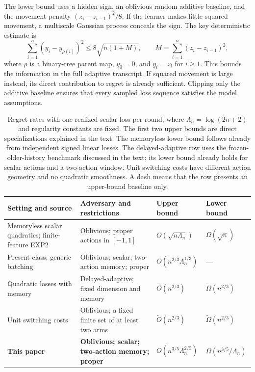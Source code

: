 \documentclass[11pt]{article}
\theoremstyle{definition}
\begin{document}
The lower bound uses a hidden sign, an oblivious random additive baseline, and the movement penalty $(z_i-z_{i-1})^2/8$. If the learner makes little squared movement, a multiscale Gaussian process conceals the sign. The key deterministic estimate is
\begin{equation}\label{eq:intro-tree}
 \sum_{i=1}^n(y_i-y_{\rho(i)})^2
 \leq 8\sqrt{n(1+M)},
 \qquad M=\sum_{i=1}^n(z_i-z_{i-1})^2,
\end{equation}
where $\rho$ is a binary-tree parent map, $y_0=0$, and $y_i=z_i$ for $i\geq1$. This bounds the information in the full adaptive transcript. If squared movement is large instead, its direct contribution to regret is already sufficient. Clipping only the additive baseline ensures that every sampled loss sequence satisfies the model assumptions.

\begin{table}[t]
\centering
\small
\setlength{\tabcolsep}{4pt}
\renewcommand{\arraystretch}{1.28}
\begin{tabularx}{\textwidth}{@{}>{\raggedright\arraybackslash}p{}>{\raggedright\arraybackslash}X>{\centering\arraybackslash}p{}>{\centering\arraybackslash}p{}@{}}
\toprule
\textbf{Setting and source} & \textbf{Adversary and restrictions} & \textbf{Upper bound} & \textbf{Lower bound}\\
\midrule
Memoryless scalar quadratics; finite-feature EXP2~\cite{bubeck}
& Oblivious; proper actions in $[-1,1]$
& $O(\sqrt{n\Lambda_n})$ & $\Omega(\sqrt n)$\\
Present class; generic batching~\cite{arora,bubeck}
& Oblivious; scalar; two-action memory; proper
& $O(n^{2/3}\Lambda_n^{1/3})$ & ---\\
Quadratic losses with memory~\cite{suggala}
& Delayed-adaptive; fixed dimension and memory
& $\widetilde O(n^{2/3})$ & $\widetilde\Omega(n^{2/3})$\\
Unit switching costs~\cite{dekel}
& Oblivious; a fixed finite set of at least two arms
& $\widetilde O(n^{2/3})$ & $\widetilde\Omega(n^{2/3})$\\
\textbf{This paper}
& \textbf{Oblivious; scalar; two-action memory; proper}
& $O(n^{3/5}\Lambda_n^{2/5})$ & $\Omega(n^{3/5}/\Lambda_n)$\\
\bottomrule
\end{tabularx}
\caption{Regret rates with one realized scalar loss per round, where $\Lambda_n=\log(2n+2)$ and regularity constants are fixed. The first two upper bounds are direct specializations explained in the text. The memoryless lower bound follows already from independent signed linear losses. The delayed-adaptive row uses the frozen-older-history benchmark discussed in the text; its lower bound already holds for scalar actions and a two-action window. Unit switching costs have different action geometry and no quadratic smoothness. A dash means that the row presents an upper-bound baseline only.}
\label{tab:comparison}
\end{table}
\end{document}
